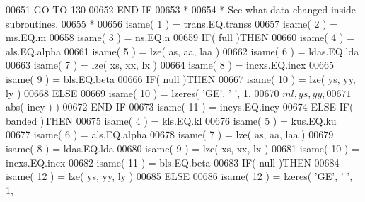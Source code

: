\begin{DoxyCode}
00651                                  \textcolor{keywordflow}{GO TO} 130
00652 \textcolor{keywordflow}{                              END IF}
00653 \textcolor{comment}{*}
00654 \textcolor{comment}{*                             See what data changed inside subroutines.}
00655 \textcolor{comment}{*}
00656                               isame( 1 ) = trans.EQ.transs
00657                               isame( 2 ) = ms.EQ.m
00658                               isame( 3 ) = ns.EQ.n
00659                               \textcolor{keywordflow}{IF}( full )\textcolor{keywordflow}{THEN}
00660                                  isame( 4 ) = als.EQ.alpha
00661                                  isame( 5 ) = lze( as, aa, laa )
00662                                  isame( 6 ) = ldas.EQ.lda
00663                                  isame( 7 ) = lze( xs, xx, lx )
00664                                  isame( 8 ) = incxs.EQ.incx
00665                                  isame( 9 ) = bls.EQ.beta
00666                                  \textcolor{keywordflow}{IF}( null )\textcolor{keywordflow}{THEN}
00667                                     isame( 10 ) = lze( ys, yy, ly )
00668                                  \textcolor{keywordflow}{ELSE}
00669                                     isame( 10 ) = lzeres( \textcolor{stringliteral}{'GE'}, \textcolor{stringliteral}{' '}, 1,
00670      $                                            ml, ys, yy,
00671      $                                            abs( incy ) )
00672 \textcolor{keywordflow}{                                 END IF}
00673                                  isame( 11 ) = incys.EQ.incy
00674                               \textcolor{keywordflow}{ELSE} \textcolor{keywordflow}{IF}( banded )\textcolor{keywordflow}{THEN}
00675                                  isame( 4 ) = kls.EQ.kl
00676                                  isame( 5 ) = kus.EQ.ku
00677                                  isame( 6 ) = als.EQ.alpha
00678                                  isame( 7 ) = lze( as, aa, laa )
00679                                  isame( 8 ) = ldas.EQ.lda
00680                                  isame( 9 ) = lze( xs, xx, lx )
00681                                  isame( 10 ) = incxs.EQ.incx
00682                                  isame( 11 ) = bls.EQ.beta
00683                                  \textcolor{keywordflow}{IF}( null )\textcolor{keywordflow}{THEN}
00684                                     isame( 12 ) = lze( ys, yy, ly )
00685                                  \textcolor{keywordflow}{ELSE}
00686                                     isame( 12 ) = lzeres( \textcolor{stringliteral}{'GE'}, \textcolor{stringliteral}{' '}, 1,

\end{DoxyCode}
